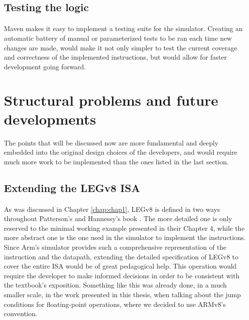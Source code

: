 \subsection*{Testing the logic}
\paragraph{}
Maven makes it easy to implement a testing suite for the simulator. Creating an automatic battery of manual or parameterized tests to be ran each time new changes are made, would make it not only simpler to test the current coverage and correctness of the implemented instructions, but would allow for faster development going forward.

\section{Structural problems and future developments}
\paragraph{}
The points that will be discussed now are more fundamental and deeply embedded into the original design choices of the developers, and would require much more work to be implemented than the ones listed in the last section. 
\subsection{Extending the LEGv8 ISA}
\paragraph{}
As was discussed in Chapter \ref{chap:chap1}, LEGv8 is defined in two ways throughout Patterson's and Hannessy's book \cite{patterson2016computer}. The more detailed one is only reserved to the minimal working example presented in their Chapter 4, while the more abstract one is the one used in the simulator to implement the instructions. Since Arm's simulator provides such a comprehensive representation of the instruction and the datapath, extending the detailed specification of LEGv8 to cover the entire ISA would be of great pedagogical help. This operation would require the developer to make informed decisions in order to be consistent with the textbook's exposition. Something like this was already done, in a much smaller scale, in the work presented in this thesis, when talking about the jump conditions for floating-point operations, where we decided to use ARMv8's convention.
